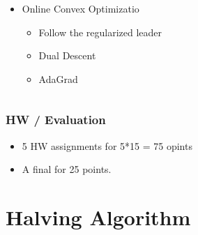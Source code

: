 \documentclass{beamer}
\begin{document}
\begin{small}
\begin{frame}
\begin{columns}
\begin{column}[t]{4cm}
\begin{itemize}
    \item Online Convex Optimizatio
      \begin{itemize}
      \item Follow the regularized leader
      \item Dual Descent
      \item AdaGrad
      \end{itemize}
    \end{itemize}
  \end{column}
\end{columns}

  \end{frame}
\end{small}

  \begin{frame}
    \frametitle{HW /  Evaluation}
    \begin{itemize}
    \item 5 HW assignments for 5*15 = 75 opints
      \item A final for 25 points.
      \end{itemize}
  \end{frame}

\section{Halving Algorithm}
\end{document}
